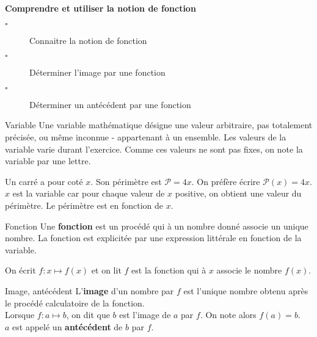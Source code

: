 \begin{titre}

\end{titre}

 
\begin{CpsCol}
\textbf{Comprendre et utiliser la notion de fonction}
\begin{description}
\item[$\square$] Connaitre la notion de fonction
\item[$\square$] Déterminer l'image par une fonction
\item[$\square$] Déterminer un antécédent par une fonction
\end{description}
\end{CpsCol}
 


 
\begin{DefT}{Variable}
Une variable  mathématique désigne une valeur arbitraire, pas totalement précisée, ou même inconnue - appartenant à un ensemble. Les valeurs de la variable varie durant l'exercice. Comme ces valeurs ne sont pas fixes, on note la variable par une lettre.
\end{DefT}

\begin{Ex}
Un carré a pour coté $x$. Son périmètre est $\mathscr P = 4x$. On préfère écrire $\mathscr{P}(x) = 4x$. $x$ est la variable car pour chaque valeur de $x$ positive, on obtient une valeur du périmètre. Le périmètre est en fonction de $x$.
\end{Ex}

\begin{DefT}{Fonction}
Une \textbf{fonction}  est un procédé qui à un nombre donné associe un unique nombre. La fonction est explicitée par une expression littérale en fonction de la variable.
\end{DefT}

\begin{Nt}
On écrit $f : x \longmapsto f(x)$ et on lit $f$ est la fonction qui à $x$ associe le nombre $f(x)$.
\end{Nt}


\begin{DefT}{Image, antécédent}
L'\textbf{image}  d'un nombre par $f$ est l'unique nombre obtenu après le procédé calculatoire de la fonction.\\ Lorsque $f : a \longmapsto b$, on dit que $b$ est l'image de $a$ par $f$. On note alors $f(a)=b$. \\
$a$ est appelé un  \textbf{antécédent} de $b$ par $f$.
\end{DefT}

